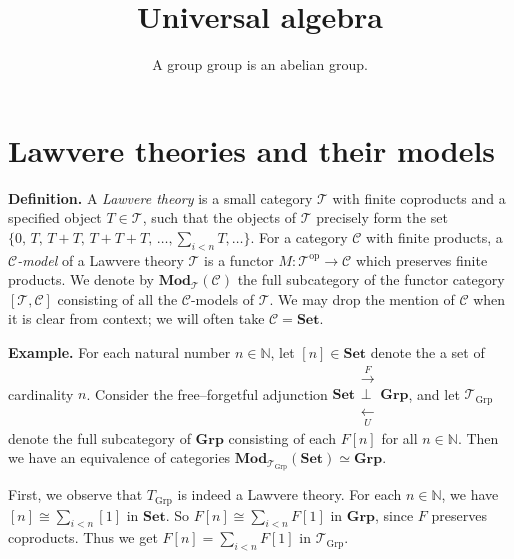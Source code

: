 \documentclass[
  letterpaper,
  DIV=11,
  numbers=noendperiod,
  oneside]{scrartcl}
\title{Universal algebra}
\subtitle{A group group is an abelian group.}
\author{}
\date{}
\begin{document}
\maketitle


\newcommand{\id}{\text{id}}
\newcommand{\op}{\mathrm{op}}
\newcommand{\Mod}{\mathbf{Mod}}
\newcommand{\C}{\mathcal{C}}

\section{Lawvere theories and their
models}\label{lawvere-theories-and-their-models}

\textbf{Definition.} A \emph{Lawvere theory} is a small category
\(\mathcal T\) with finite coproducts and a specified object
\(T \in \mathcal T\), such that the objects of \(\mathcal T\) precisely
form the set
\(\{0,\, T,\, T + T,\, T + T + T,\, \dots, \sum_{i < n} T, \dots\}\).
For a category \(\mathcal{C}\) with finite products, a
\emph{\(\mathcal{C}\)-model} of a Lawvere theory \(\mathcal T\) is a
functor \(M \colon \mathcal T^\mathrm{op}\to \mathcal{C}\) which
preserves finite products. We denote by
\(\mathbf{Mod}_{\mathcal T}(\mathcal{C})\) the full subcategory of the
functor category \([\mathcal T, \mathcal{C}]\) consisting of all the
\(\mathcal{C}\)-models of \(\mathcal T\). We may drop the mention of
\(\mathcal{C}\) when it is clear from context; we will often take
\(\mathcal{C}= \mathbf{Set}\).

\textbf{Example.} For each natural number \(n \in \mathbb N\), let
\([n] \in \mathbf{Set}\) denote the a set of cardinality \(n\). Consider
the free--forgetful adjunction
\(\mathbf{Set} \substack{\xrightarrow{F} \\ \perp \\ \xleftarrow[U]{}} \mathbf{Grp}\),
and let \(\mathcal T_{\mathrm{Grp}}\) denote the full subcategory of
\(\mathbf{Grp}\) consisting of each \(F[n]\) for all
\(n \in \mathbb N\). Then we have an equivalence of categories
\(\mathbf{Mod}_{\mathcal T_{\mathrm{Grp}}}(\mathbf{Set}) \simeq \mathbf{Grp}\).

First, we observe that \(T_{\mathrm{Grp}}\) is indeed a Lawvere theory.
For each \(n \in \mathbb N\), we have \([n] \cong \sum_{i < n} [1]\) in
\(\mathbf{Set}\). So \(F[n] \cong \sum_{i < n} F[1]\) in
\(\mathbf{Grp}\), since \(F\) preserves coproducts. Thus we get
\(F[n] = \sum_{i < n} F[1]\) in \(\mathcal T_{\mathrm{Grp}}\).
\end{document}
